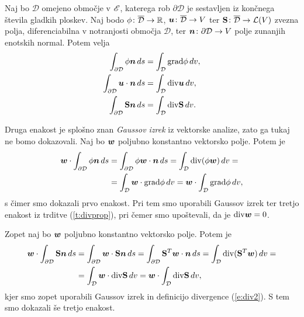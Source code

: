 \begin{izrek} \label{i:divtheo}
	Naj bo $\mathcal{D}$ omejeno območje v $\mathscr E$, katerega rob $\partial\mathcal{D}$ je sestavljen
	iz končnega števila gladkih ploskev. Naj bodo $\phi\colon\overline{\mathcal{D}}\to\mathbb R$,
	$\boldsymbol u\colon\overline{\mathcal{D}}\to V$ ter $\mathbf S\colon\overline{\mathcal{D}}\to\mathcal L(V)$
	zvezna polja, diferenciabilna v notranjosti območja $\mathcal{D}$, ter $\boldsymbol n\colon\partial\mathcal{D}\to V$
	polje zunanjih enotskih normal. Potem velja
	\begin{align*}
		\int_{\partial\mathcal{D}} \phi\boldsymbol n\,ds &= \int_{\mathcal{D}} \mathrm{grad}\phi\,dv, \\
		\int_{\partial\mathcal{D}} \boldsymbol u\cdot\boldsymbol n\,ds &= \int_{\mathcal{D}} \mathrm{div}\boldsymbol u\,dv, \\
		\int_{\partial\mathcal{D}} \mathbf S\boldsymbol n\,ds &= \int_{\mathcal{D}} \mathrm{div}\mathbf S\,dv.
	\end{align*}
\end{izrek}
\proof
	Druga enakost je splošno znan \emph{Gaussov izrek} iz vektorske analize, zato ga tukaj ne bomo dokazovali.
	Naj bo $\boldsymbol w$ poljubno konstantno vektorsko polje. Potem je
	\begin{align*}
		\boldsymbol w\cdot\int_{\partial\mathcal{D}}\phi\boldsymbol n\,ds &= \int_{\partial\mathcal{D}}\phi\boldsymbol w\cdot\boldsymbol n\,ds=
		\int_{\mathcal{D}}\mathrm{div}(\phi\boldsymbol w)\,dv = \\
		&= \int_{\mathcal{D}}\boldsymbol w\cdot\mathrm{grad}\phi \,dv = \boldsymbol w\cdot\int_{\mathcal{D}}\mathrm{grad}\phi \,dv,
	\end{align*}
	s čimer smo dokazali prvo enakost.
	Pri tem smo uporabili Gaussov izrek ter tretjo enakost iz trditve (\ref{t:divprop}), pri čemer
	smo upoštevali, da je $\mathrm{div}\boldsymbol w=0$.
	
	Zopet naj bo $\boldsymbol w$ poljubno konstantno vektorsko polje. Potem je
	\begin{align*}
		\boldsymbol w\cdot\int_{\partial\mathcal{D}}\mathbf S\boldsymbol n\,ds &= \int_{\partial\mathcal{D}}\boldsymbol w\cdot\mathbf S\boldsymbol n\,ds=
		\int_{\partial\mathcal{D}}\mathbf S^T\boldsymbol w\cdot\boldsymbol n\,ds=
		\int_{\mathcal{D}}\mathrm{div}(\mathbf S^T\boldsymbol w)\,dv = \\ &=\int_{\mathcal{D}}\boldsymbol w\cdot\mathrm{div}\mathbf S\,dv=
		\boldsymbol w\cdot\int_{\mathcal{D}}\mathrm{div}\mathbf S\,dv,
	\end{align*}
	kjer smo zopet uporabili Gaussov izrek in definicijo divergence (\ref{e:div2}). S tem smo dokazali še tretjo enakost.
\endproof

